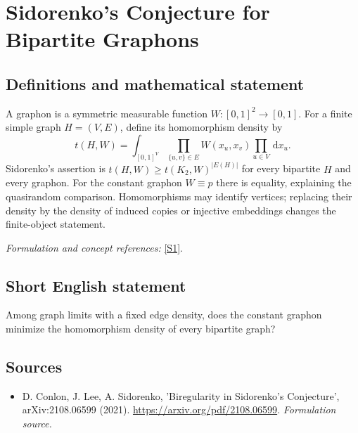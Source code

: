 \documentclass[11pt]{article}
\begin{document}
\section*{\texorpdfstring{Sidorenko's Conjecture for Bipartite Graphons}{Sidorenko's Conjecture for Bipartite Graphons}}\label{30003139}
\subsection{Definitions and mathematical statement}
A graphon is a symmetric measurable function $W:[0,1]^2\to[0,1]$. For a finite simple graph $H=(V,E)$, define its homomorphism density by
\[
 t(H,W)=\int_{[0,1]^{V}}\prod_{\{u,v\}\in E}W(x_u,x_v)\prod_{u\in V}{\,\mathrm{d}} x_u.
\]
Sidorenko's assertion is
$t(H,W)\ge t(K_2,W)^{|E(H)|}$ for every bipartite $H$ and every graphon. For the constant graphon $W\equiv p$ there is equality, explaining the quasirandom comparison. Homomorphisms may identify vertices; replacing their density by the density of induced copies or injective embeddings changes the finite-object statement.
\par\smallskip\textit{Formulation and concept references:} \href{https://arxiv.org/pdf/2108.06599}{[S1]}.

\subsection{Short English statement}
Among graph limits with a fixed edge density, does the constant graphon minimize the homomorphism density of every bipartite graph?
\subsection{Sources}
\begin{itemize}
\item[S1]D. Conlon, J. Lee, A. Sidorenko, 'Biregularity in Sidorenko's Conjecture', arXiv:2108.06599 (2021).
\url{https://arxiv.org/pdf/2108.06599}.
\textit{Formulation source.}
\end{itemize}
\end{document}
